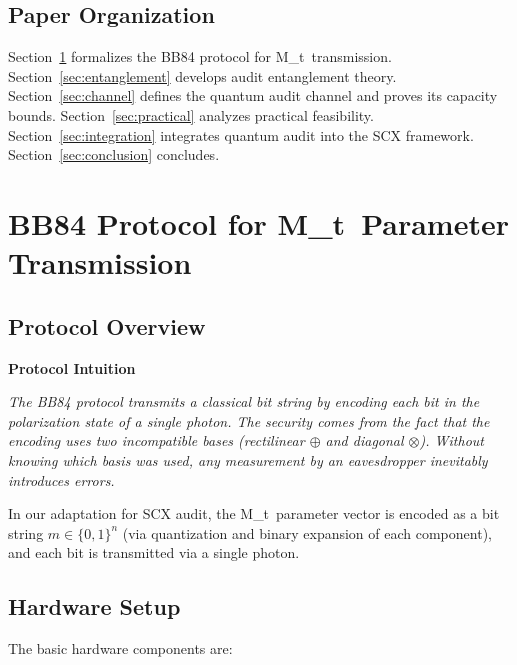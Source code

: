 \documentclass[11pt,a4paper]{article}
\theoremstyle{plain}
\theoremstyle{definition}
\theoremstyle{remark}
\newenvironment{bilingual}[2]{%
  \medskip\noindent\textbf{#1}\par\noindent\textit{#2}\par\smallskip
}{}
\newcommand{\Mt}{M_t}
\begin{document}
\subsection{Paper Organization}
\label{sec:org}

Section~\ref{sec:bb84} formalizes the BB84 protocol for \Mt\ transmission.
Section~\ref{sec:entanglement} develops audit entanglement theory.
Section~\ref{sec:channel} defines the quantum audit channel and proves its
capacity bounds. Section~\ref{sec:practical} analyzes practical feasibility.
Section~\ref{sec:integration} integrates quantum audit into the SCX framework.
Section~\ref{sec:conclusion} concludes.

\section{BB84 Protocol for \Mt\ Parameter Transmission}
\label{sec:bb84}

\subsection{Protocol Overview}
\label{sec:bb84_overview}

\begin{bilingual}
{Protocol Intuition}
{The BB84 protocol transmits a classical bit string by encoding each bit in
the polarization state of a single photon. The security comes from the fact
that the encoding uses two incompatible bases (rectilinear $\oplus$ and
diagonal $\otimes$). Without knowing which basis was used, any measurement
by an eavesdropper inevitably introduces errors.}
\end{bilingual}

In our adaptation for SCX audit, the \Mt\ parameter vector is encoded as a
bit string $m \in \{0,1\}^n$ (via quantization and binary expansion of each
component), and each bit is transmitted via a single photon.

\subsection{Hardware Setup}
\label{sec:bb84_hardware}

The basic hardware components are:
\end{document}
